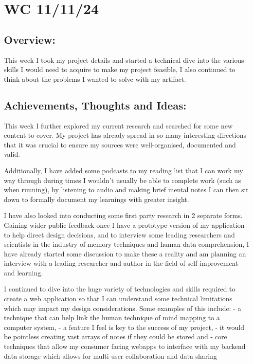 \section{WC 11/11/24}

\subsection*{Overview:}
This week I took my project details and started a technical dive into the various skills I would need to acquire to make my project feasible, I also continued to think about the problems I wanted to solve with my artifact.

\subsection*{Achievements, Thoughts and Ideas:}
This week I further explored my current research and searched for some new content to cover. My project has already spread in so many interesting directions that it was crucial to ensure my sources were well-organised, documented and valid.

Additionally, I have added some podcasts to my reading list that I can work my way through during times I wouldn't usually be able to complete work (such as when running), by listening to audio and making brief mental notes I can then sit down to formally document my learnings with greater insight.

I have also looked into conducting some first party research in 2 separate forms. Gaining wider public feedback once I have a prototype version of my application - to help direct design decisions, and to interview some leading researchers and scientists in the industry of memory techniques and human data comprehension, I have already started some discussion to make these a reality and am planning an interview with a leading researcher and author in the field of self-improvement and learning.

I continued to dive into the huge variety of technologies and skills required to create a web application so that I can understand some technical limitations which may impact my design considerations. Some examples of this include:  - a technique that can help link the human technique of mind mapping to a computer system,  - a feature I feel is key to the success of my project,  - it would be pointless creating vast arrays of notes if they could be stored and  - core techniques that allow my consumer facing webapps to interface with my backend data storage which allows for multi-user collaboration and data sharing

